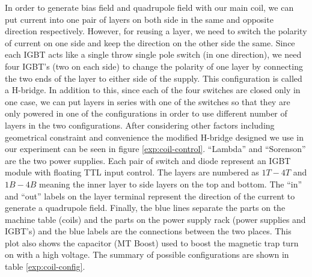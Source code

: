 In order to generate bias field and quadrupole field with our main coil, we can put current into one pair of layers on both side in the same and opposite direction respectively. However, for reusing a layer, we need to switch the polarity of current on one side and keep the direction on the other side the same. Since each IGBT acts like a single throw single pole switch (in one direction), we need four IGBT's (two on each side) to change the polarity of one layer by connecting the two ends of the layer to either side of the supply. This configuration is called a H-bridge. In addition to this, since each of the four switches are closed only in one case, we can put layers in series with one of the switches so that they are only powered in one of the configurations in order to use different number of layers in the two configurations. After considering other factors including geometrical constraint and convenience the modified H-bridge designed we use in our experiment can be seen in figure \ref{exp:coil-control}. ``Lambda'' and ``Sorenson'' are the two power supplies. Each pair of switch and diode represent an IGBT module with floating TTL input control. The layers are numbered as $1T-4T$ and $1B-4B$ meaning the inner layer to side layers on the top and bottom. The ``in'' and ``out'' labels on the layer terminal represent the direction of the current to generate a quadrupole field. Finally, the blue lines separate the parts on the machine table (coils) and the parts on the power supply rack (power supplies and IGBT's) and the blue labels are the connections between the two places. This plot also shows the capacitor (MT Boost) used to boost the magnetic trap turn on with a high voltage. The summary of possible configurations are shown in table \ref{exp:coil-config}.

